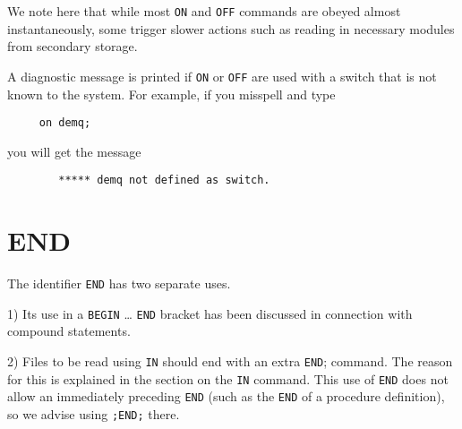 We note here that while most \texttt{ON} and \texttt{OFF} commands are obeyed
almost instantaneously, some trigger slower actions such as
reading in necessary modules from secondary storage.

A diagnostic message is printed if \texttt{ON} or \texttt{OFF}
 are used with a switch that is not known to the system.  For
example, if you misspell  and type
\begin{verbatim}
     on demq;
\end{verbatim}
you will get the message
\begin{verbatim}
        ***** demq not defined as switch.
\end{verbatim}

\section{END}
\hypertarget{reserved:END}{}

The identifier \texttt{END} has two separate uses.

1) Its use in a \texttt{BEGIN} \ldots{} \texttt{END} bracket has been
discussed in connection with compound statements.

2) Files to be read using \texttt{IN} should end with an extra \texttt{END};
command.  The reason for this is explained in the section on the \texttt{IN}
command.  This use of \texttt{END} does not allow an immediately
preceding \texttt{END} (such as the \texttt{END} of a procedure definition), so
we advise using \texttt{;END;} there.



